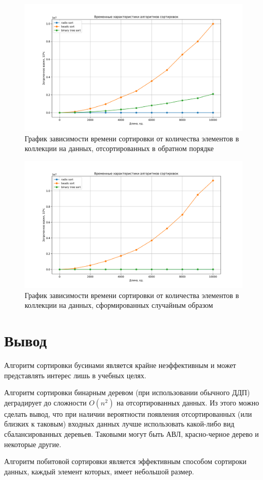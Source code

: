 \begin{figure}[h!]
\centering
\includegraphics[width=1\linewidth]{inc/img/sort_time_graph_1.png}
\caption{График зависимости времени сортировки от количества элементов в коллекции на данных, отсортированных в обратном порядке}
\label{gra:rsor}
\end{figure}

\begin{figure}[h!]
\centering
\includegraphics[width=1\linewidth]{inc/img/sort_time_graph_2.png}
\caption{График зависимости времени сортировки от количества элементов в коллекции на данных, сформированных случайным образом}
\label{gra:rand}
\end{figure}

\section*{Вывод}

Алгоритм сортировки бусинами является крайне неэффективным и может представлять интерес лишь в учебных целях.

Алгоритм сортировки бинарным деревом (при использовании обычного ДДП) деградирует до сложности $O(n^2)$ на отсортированных данных. Из этого можно сделать вывод, что при наличии  вероятности появления отсортированных (или близких к таковым) входных данных лучше использовать какой-либо вид сбалансированных деревьев. Таковыми могут быть АВЛ, красно-черное дерево и некоторые другие.

Алгоритм побитовой сортировки является  эффективным способом сортироки данных, каждый элемент которых, имеет небольшой размер.


